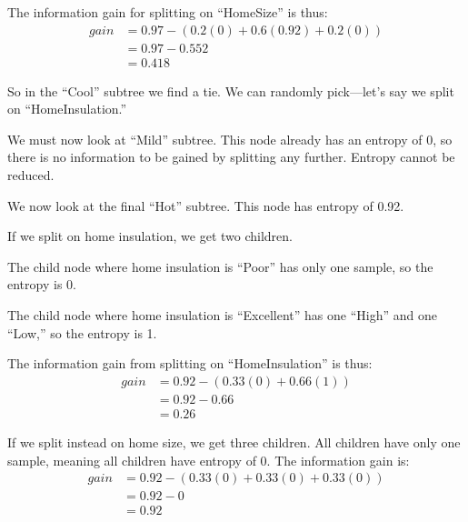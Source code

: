 \documentclass{article}
\begin{document}
\begin{enumerate}
\begin{enumerate}
                The information gain for splitting on ``HomeSize'' is thus:
                \begin{align*}
                    gain &= 0.97 - \left(0.2(0) + 0.6(0.92) + 0.2(0)\right) \\
                    &= 0.97 - 0.552 \\
                    &= 0.418
                \end{align*}

                So in the ``Cool'' subtree we find a tie. We can randomly
                pick—let's say we split on ``HomeInsulation.''

                We must now look at ``Mild'' subtree. This node already has an
                entropy of 0, so there is no information to be gained by
                splitting any further. Entropy cannot be reduced.

                We now look at the final ``Hot'' subtree. This node has entropy
                of 0.92.

                If we split on home insulation, we get two children.

                The child node where home insulation is ``Poor'' has only one
                sample, so the entropy is 0.

                The child node where home insulation is ``Excellent'' has one
                ``High'' and one ``Low,'' so the entropy is 1.

                The information gain from splitting on ``HomeInsulation'' is
                thus:
                \begin{align*}
                    gain &= 0.92 - \left(0.33(0) + 0.66(1)\right) \\
                    &= 0.92 - 0.66 \\
                    &= 0.26
                \end{align*}

                If we split instead on home size, we get three children. All
                children have only one sample, meaning all children have
                entropy of 0. The information gain is:
                \begin{align*}
                    gain &= 0.92 - \left(0.33(0) + 0.33(0) + 0.33(0)\right) \\
                    &= 0.92 - 0 \\
                    &= 0.92
                \end{align*}


\end{enumerate}
\end{enumerate}
\end{document}
